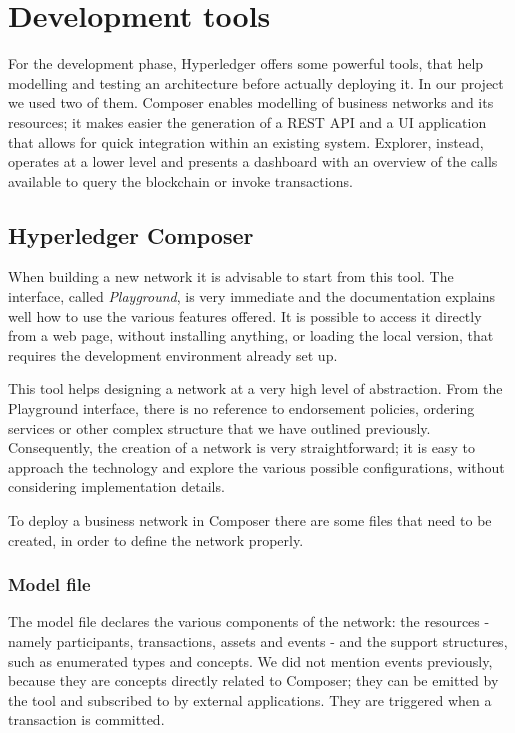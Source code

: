 \section{Development tools}
\label{sec:dev_tools}
For the development phase, Hyperledger offers some powerful tools, that help modelling and testing an architecture before actually deploying it. In our project we used two of them. Composer enables modelling of business networks and its resources; it makes easier the generation of a REST API and a UI application that allows for quick integration within an existing system. Explorer, instead, operates at a lower level and presents a dashboard with an overview of the calls available to query the blockchain or invoke transactions.

\subsection{Hyperledger Composer}
\label{sec:composer}
When building a new network it is advisable to start from this tool. The interface, called \emph{Playground}, is very immediate and the documentation explains well how to use the various features offered. It is possible to access it directly from a web page, without installing anything, or loading the local version, that requires the development environment already set up. 

This tool helps designing a network at a very high level of abstraction. From the Playground interface, there is no reference to endorsement policies, ordering services or other complex structure that we have outlined previously. Consequently, the creation of a network is very straightforward; it is easy to approach the technology and explore the various possible configurations, without considering implementation details. 

To deploy a business network in Composer there are some files that need to be created, in order to define the network properly.

\subsubsection{Model file}
The model file declares the various components of the network: the resources - namely participants, transactions, assets and events - and the support structures, such as enumerated types and concepts. We did not mention events previously, because they are concepts directly related to Composer; they can be emitted by the tool and subscribed to by external applications. They are triggered when a transaction is committed.

